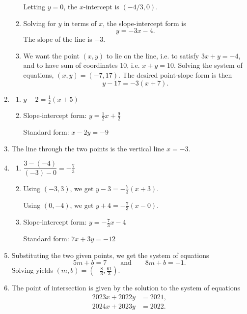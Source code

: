 \begin{enumerate}
\begin{enumerate}
Letting $y = 0$, the $x$-intercept is $\boxed{(-4/3, 0)}$.
\item Solving for $y$ in terms of $x$, the slope-intercept form is 
\begin{equation*}
\boxed{y = -3x - 4}.
\end{equation*}
The slope of the line is $\boxed{-3}$.
\item We want the point $(x,y)$ to lie on the line, i.e. to satisfy $3x + y = -4$, and to have sum of coordinates 10, i.e. $x + y = 10$. Solving the system of equations, $(x,y) = \boxed{(-7,17)}$. The desired point-slope form is then
\begin{equation*}
\boxed{y - 17 = -3(x + 7)}.
\end{equation*}
\end{enumerate}
\item \begin{enumerate}
\item $y - 2 = \frac{1}{2}(x + 5)$
\item Slope-intercept form: $y = \frac{1}{2}x + \frac{9}{2}$\par
Standard form: $x - 2y = -9$
\end{enumerate}
\item The line through the two points is the vertical line $\boxed{x = -3}$.
\item \begin{enumerate}
\item $\dfrac{3 - (-4)}{(-3) - 0} = \boxed{-\frac{7}{3}}$
\item Using $(-3,3)$, we get $\boxed{y - 3 = -\frac{7}{3}(x + 3)}$.\par 
Using $(0, -4)$, we get $\boxed{y + 4 = -\frac{7}{3}(x - 0)}$.
\item Slope-intercept form: $\boxed{y = -\frac{7}{3}x - 4}$\par 
Standard form: $\boxed{7x + 3y = -12}$
\end{enumerate}
\item Substituting the two given points, we get the system of equations
\begin{equation*}
5m + b = 7\qquad\text{and}\qquad 8m + b = -1.
\end{equation*}
Solving yields $\boxed{(m,b) = \left(-\frac{8}{3}, \frac{61}{3}\right)}$.
\item The point of intersection is given by the solution to the system of equations
\begin{align*}
2023x + 2022y &= 2021, \tag{1} \\
2024x + 2023y &= 2022. \tag{2}

\end{align*}
\end{enumerate}
